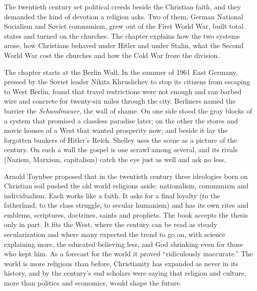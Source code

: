 
\begin{inbrief}
The twentieth century set political creeds beside the Christian faith, and they demanded the kind of
devotion a religion asks. Two of them, German National Socialism and Soviet communism, grew out of the
First World War, built total states and turned on the churches. The chapter explains how the two
systems arose, how Christians behaved under Hitler and under Stalin, what the Second World War cost
the churches and how the Cold War froze the division.
\end{inbrief}

The chapter starts at the Berlin Wall. In the summer of 1961 East Germany, pressed by the Soviet
leader Nikita Khrushchev to stop its citizens from escaping to West Berlin, found that travel
restrictions were not enough and ran barbed wire and concrete for twenty-six miles through the city.
Berliners named the barrier the \emph{Schandmauer}, the wall of shame. On one side stood the gray
blocks of a system that promised a classless paradise later; on the other the stores and movie houses
of a West that wanted prosperity now; and beside it lay the forgotten bunkers of Hitler's Reich.
Shelley uses the scene as a picture of the century. On such a wall the gospel is one scrawl among
several, and its rivals (Nazism, Marxism, capitalism) catch the eye just as well and ask no less.

Arnold Toynbee proposed that in the twentieth century three ideologies born on Christian soil pushed
the old world religions aside: nationalism, communism and individualism. Each works like a faith. It
asks for a final loyalty (to the fatherland, to the class struggle, to secular humanism) and has its
own rites and emblems, scriptures, doctrines, saints and prophets. The book accepts the thesis only
in part. It fits the West, where the century can be read as steady secularization and where many
expected the trend to go on, with science explaining more, the educated believing less, and God
shrinking even for those who kept him. As a forecast for the world it proved ``ridiculously
inaccurate.'' The world is more religious than before, Christianity has expanded as never in its
history, and by the century's end scholars were saying that religion and culture, more than politics
and economics, would shape the future.

